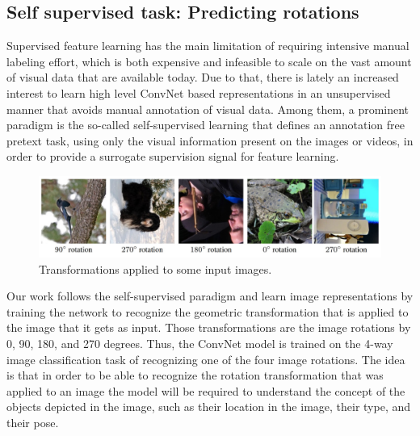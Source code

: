 \documentclass{article}
\begin{document}
\subsection{Self supervised task: Predicting rotations}
\begin{flushleft}
Supervised feature learning has the main limitation of requiring intensive manual labeling effort, which is both expensive and
infeasible to scale on the vast amount of visual data that are available today.
Due to that, there is lately an increased interest to learn high level ConvNet based representations
in an unsupervised manner that avoids manual annotation of visual data.
Among them, a prominent paradigm is the so-called self-supervised learning that defines an annotation free pretext task,
using only the visual information present on the images or videos, in order to provide a surrogate
supervision signal for feature learning.
\end{flushleft}
\begin{flushleft}
    \begin{figure}[h]
        \centering
        \includegraphics[scale=0.45]{rotations}
        \caption{ Transformations applied to some input images. }
    \end{figure}
Our work follows the self-supervised paradigm and learn image representations by training the network to recognize the geometric transformation that is applied to the image that it gets as
input.
Those transformations are the image rotations by 0, 90, 180, and 270 degrees. Thus,
the ConvNet model is trained on the 4-way image classification task of recognizing one of the four
image rotations. The idea is that in order to be able to recognize the
rotation transformation that was applied to an image the model will be required to understand the concept of
the objects depicted in the image, such as their location in the image, their type, and
their pose.
\end{flushleft}
\end{document}

